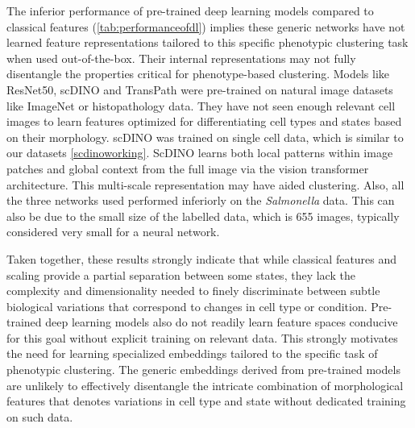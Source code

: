 \documentclass[12pt,a4paper]{article}
\begin{document}
The inferior performance of pre-trained deep learning models compared to classical features (\ref{tab:performanceofdl}) implies these generic networks have not learned feature representations tailored to this specific phenotypic clustering task when used out-of-the-box. Their internal representations may not fully disentangle the properties critical for phenotype-based clustering. Models like ResNet50, scDINO and TransPath were pre-trained on natural image datasets like ImageNet or histopathology data. They have not seen enough relevant cell images to learn features optimized for differentiating cell types and states based on their morphology. scDINO was trained on single cell data, which is similar to our datasets \ref{scdinoworking}. ScDINO learns both local patterns within image patches and global context from the full image via the vision transformer architecture. This multi-scale representation may have aided clustering. Also, all the three networks used performed inferiorly on the \textit{Salmonella} data. This can also be due to the small size of the labelled data, which is 655 images, typically considered very small for a neural network.

Taken together, these results strongly indicate that while classical features and scaling provide a partial separation between some states, they lack the complexity and dimensionality needed to finely discriminate between subtle biological variations that correspond to changes in cell type or condition. Pre-trained deep learning models also do not readily learn feature spaces conducive for this goal without explicit training on relevant data. This strongly motivates the need for learning specialized embeddings tailored to the specific task of phenotypic clustering. The generic embeddings derived from pre-trained models are unlikely to effectively disentangle the intricate combination of morphological features that denotes variations in cell type and state without dedicated training on such data. 
\end{document}
